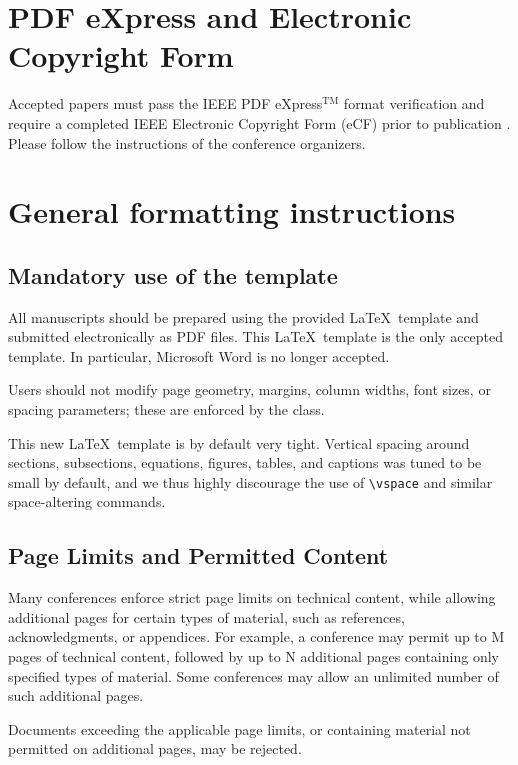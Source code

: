 \documentclass[9pt]{ieeeconf}
\begin{document}
\section{PDF eXpress and Electronic Copyright Form}
\label{sec:PDF_express_Copyright}

Accepted papers must pass the IEEE PDF eXpress$^{\text{TM}}$ format verification and require a completed IEEE Electronic Copyright Form (eCF) prior to publication \cite{IEEEXploreReqs}. Please follow the instructions of the conference organizers.


\section{General formatting instructions}
\label{sec:format}

\subsection{Mandatory use of the template}
\label{sec:template}

All manuscripts should be prepared using the provided \LaTeX\ template and submitted electronically as PDF files. This \LaTeX\ template is the only accepted template. In particular, Microsoft Word is no longer accepted.

Users should not modify page geometry, margins, column widths, font sizes, or spacing parameters; these are enforced by the class.

This new \LaTeX\ template is by default very tight. Vertical spacing around sections, subsections, equations, figures, tables, and captions was tuned to be small by default, and we thus highly discourage the use of \texttt{\textbackslash{vspace}} and similar space-altering commands. 

\subsection{Page Limits and Permitted Content}
\label{sec:pagelimit}

Many conferences enforce strict page limits on technical content, while allowing additional pages for certain types of material, such as references, acknowledgments, or appendices. For example, a conference may permit up to M pages of technical content, followed by up to N additional pages containing only specified types of material. Some conferences may allow an unlimited number of such additional pages.

Documents exceeding the applicable page limits, or containing material not permitted on additional pages, may be rejected.
\end{document}
